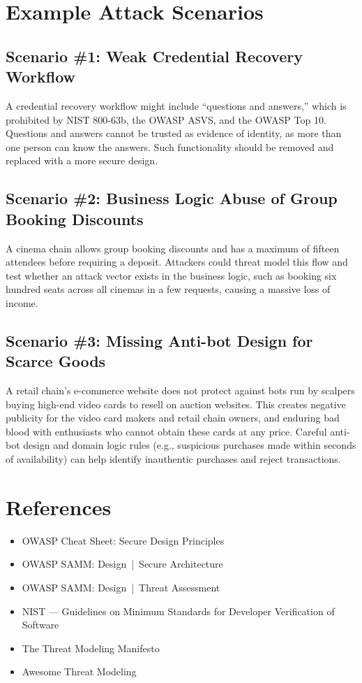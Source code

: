 \documentclass[11pt]{article}
\begin{document}
\section{Example Attack Scenarios}

\subsection{Scenario \#1: Weak Credential Recovery Workflow}
A credential recovery workflow might include ``questions and answers,'' which is prohibited by NIST 800-63b, the OWASP ASVS, and the OWASP Top 10. Questions and answers cannot be trusted as evidence of identity, as more than one person can know the answers. Such functionality should be removed and replaced with a more secure design.

\subsection{Scenario \#2: Business Logic Abuse of Group Booking Discounts}
A cinema chain allows group booking discounts and has a maximum of fifteen attendees before requiring a deposit. Attackers could threat model this flow and test whether an attack vector exists in the business logic, such as booking six hundred seats across all cinemas in a few requests, causing a massive loss of income.

\subsection{Scenario \#3: Missing Anti-bot Design for Scarce Goods}
A retail chain’s e-commerce website does not protect against bots run by scalpers buying high-end video cards to resell on auction websites. This creates negative publicity for the video card makers and retail chain owners, and enduring bad blood with enthusiasts who cannot obtain these cards at any price. Careful anti-bot design and domain logic rules (e.g., suspicious purchases made within seconds of availability) can help identify inauthentic purchases and reject transactions.

\section{References}
\begin{itemize}
  \item OWASP Cheat Sheet: Secure Design Principles
  \item OWASP SAMM: Design \,|\, Secure Architecture
  \item OWASP SAMM: Design \,|\, Threat Assessment
  \item NIST --- Guidelines on Minimum Standards for Developer Verification of Software
  \item The Threat Modeling Manifesto
  \item Awesome Threat Modeling
\end{itemize}
\end{document}
